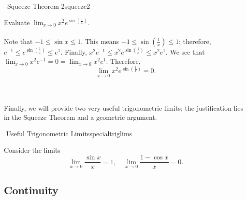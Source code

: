         \begin{example}{\Difficulty\,\Difficulty\,\,Squeeze Theorem 2}{squeeze2}

            Evaluate \(\lim_{x\to 0}x^2e^{\sin\left(\frac{1}{x}\right)}\).
            \\
            \\
            Note that \(-1\leq \sin x\leq 1\). This means \(-1\leq \sin\left(\frac{1}{x}\right)\leq 1\); therefore, \(e^{-1}\leq e^{\sin\left(\frac{1}{x}\right)}\leq e^1\). Finally, \(x^2e^{-1}\leq x^2e^{\sin\left(\frac{1}{x}\right)}\leq x^2e^1\). We see that \(\lim_{x\to 0}x^2e^{-1}=0=\lim_{x\to 0}x^2e^1\). Therefore,
            \begin{equation*}
                \lim_{x\to 0}x^2e^{\sin\left(\frac{1}{x}\right)}=0.
            \end{equation*}
            
        \end{example}
        \pagebreak
        \vphantom
        \\
        \\
        Finally, we will provide two very useful trigonometric limits; the justification lies in the Squeeze Theorem and a geometric argument.
        \begin{theorem}{\Stop\,\,Useful Trigonometric Limits}{specialtriglims}

            Consider the limits
            \begin{equation*}
                \lim_{x\to 0}\frac{\sin x}{x}=1,\quad\lim_{x\to 0}\frac{1-\cos x}{x}=0.
            \end{equation*}
            
        \end{theorem}

    \pagebreak

    \subsection{Continuity}

